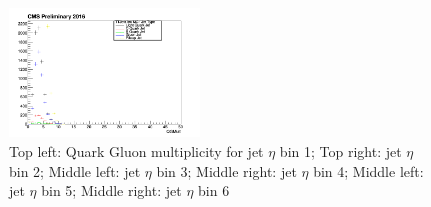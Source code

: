 \begin{figure}[htbp]
\begin{center}
  \includegraphics[width=0.45\textwidth]{sections/mc4/TopTagger/figures/_b_qgmultjetetabin5_.png}
 \end{center}
 \caption{Top left: Quark Gluon multiplicity for jet $\eta$ bin 1; Top right: jet $\eta$ bin 2; Middle left: jet $\eta$ bin 3; Middle right: jet $\eta$ bin 4; Middle left: jet $\eta$ bin 5; Middle right: jet $\eta$ bin 6}
 \label{fig:c4ttqgmultjeteta}
\end{figure}


